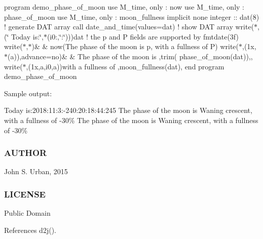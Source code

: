 program demo\+\_\+phase\+\_\+of\+\_\+moon use M\+\_\+time, only \+: now use M\+\_\+time, only \+: phase\+\_\+of\+\_\+moon use M\+\_\+time, only \+: moon\+\_\+fullness implicit none integer \+:\+: dat(8) ! generate D\+AT array call date\+\_\+and\+\_\+time(values=dat) ! show D\+AT array write($\ast$,\textquotesingle{}(\char`\"{} Today is\+:\char`\"{},$\ast$(i0\+:,\char`\"{}\+:\char`\"{}))\textquotesingle{})dat ! the p and P fields are supported by fmtdate(3f) write($\ast$,$\ast$)\& \& now(\textquotesingle{}The phase of the moon is p, with a fullness of P\textquotesingle{}) write($\ast$,\textquotesingle{}(1x,$\ast$(a))\textquotesingle{},advance=\textquotesingle{}no\textquotesingle{})\& \& \textquotesingle{}The phase of the moon is \textquotesingle{},trim( phase\+\_\+of\+\_\+moon(dat)),\textquotesingle{},\textquotesingle{} write($\ast$,\textquotesingle{}(1x,a,i0,a)\textquotesingle{})\textquotesingle{}with a fullness of \textquotesingle{},moon\+\_\+fullness(dat),\textquotesingle{}\textquotesingle{} end program demo\+\_\+phase\+\_\+of\+\_\+moon

Sample output\+:

Today is\+:2018\+:11\+:3\+:-\/240\+:20\+:18\+:44\+:245 The phase of the moon is Waning crescent, with a fullness of -\/30\% The phase of the moon is Waning crescent, with a fullness of -\/30\%

\subsubsection*{A\+U\+T\+H\+OR}

John S. Urban, 2015 \subsubsection*{L\+I\+C\+E\+N\+SE}

Public Domain 

References d2j().

